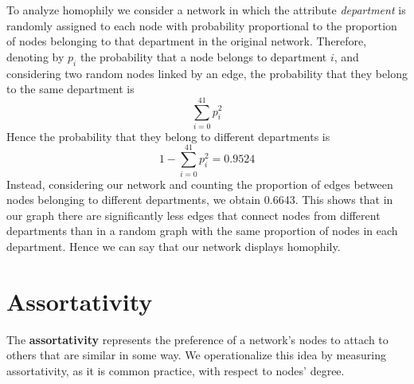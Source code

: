\documentclass{report}
\theoremstyle{definition}
\theoremstyle{remark}
\begin{document}
To analyze homophily we consider a network in which the attribute \textit{department} is randomly assigned to each node with probability proportional to the proportion of nodes belonging to that department in the original network. Therefore, denoting by $p_i$ the probability that a node belongs to department $i$, and considering two random nodes linked by an edge, the probability that they belong to the same department is
\begin{equation*}
\sum_{i=0}^{41} p_i^2
\end{equation*}
Hence the probability that they belong to different departments is
\begin{equation*}
1-\sum_{i=0}^{41} p_i^2 = 0.9524
\end{equation*}
Instead, considering our network and counting the proportion of edges between nodes belonging to different departments, we obtain 0.6643. This shows that in our graph there are significantly less edges that connect nodes from different departments than in a random graph with the same proportion of nodes in each department. Hence we can say that our network displays homophily.
\section*{Assortativity}
The \textbf{assortativity} represents the preference of a network's nodes to attach  to others that are similar in some way. We operationalize this idea by measuring assortativity, as it is common practice, with respect to nodes' degree.
\end{document}
